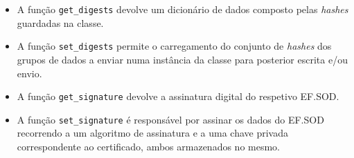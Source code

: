 \begin{itemize}
    \item A função \texttt{get\_digests} devolve um dicionário de dados composto pelas \textit{hashes} guardadas na classe.
    \item A função \texttt{set\_digests} permite o carregamento do conjunto de \textit{hashes} dos grupos de dados a enviar numa instância da classe para posterior escrita e/ou envio.
    \item A função \texttt{get\_signature} devolve a assinatura digital do respetivo EF.SOD.
    \item A função \texttt{set\_signature} é responsável por assinar os dados do EF.SOD recorrendo a um algoritmo de assinatura e a uma chave privada correspondente ao certificado, ambos armazenados no mesmo.
\end{itemize}

